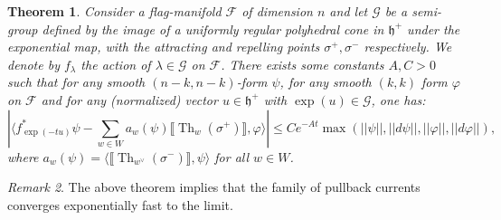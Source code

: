 \documentclass[12pt]{amsbook}%
\newtheorem{thm}{Theorem}[chapter]
\theoremstyle{definition}
\theoremstyle{remark}
\newtheorem{rem}[thm]{Remark}
\numberwithin{section}{chapter}
\numberwithin{subsection}{section}
\numberwithin{figure}{chapter}
\DeclareMathOperator{\Th}{Th}
\newcommand\intcur[1]{\llbracket #1 \rrbracket}
\def\cF{{\mathscr{F}}}
\begin{document}
{{  
\begin{thm} \label{thm_extension_harvey_lawson} Consider a flag-manifold $\cF$ of dimension $n$ and let $\mathcal{G}$ be a semi-group defined by the image of a uniformly regular polyhedral cone in $\mathfrak{h}^+$ under the exponential map, with the attracting and repelling points $\sigma^+, \sigma^-$ respectively. 
We denote by  $f_{\lambda}$ the action of $ \lambda\in \mathcal{G}$ on $\cF$. There exists
some constants $A,C>0$ such that for any smooth  $(n-k,n-k)$-form $\psi$, for any smooth $(k,k)$ form $ \varphi$ on $\cF$ and
 for any (normalized) vector  $ u\in \mathfrak{h}^+$ with $\exp(u) \in \mathcal{G}$, one has: 
\begin{equation}\label{eq_diff_smooth}
\left| \langle f_{\exp({-tu})}^* \psi - \sum_{w\in W} a_w(\psi) \intcur{\Th_w(\sigma^+) } , \varphi \rangle \right | \leqslant C e^{- At} \max (||\psi ||, || d\psi || , ||\varphi ||, || d\varphi||),
\end{equation}    
where $a_w (\psi) = \langle \intcur{\Th_{w^\vee}(\sigma^-)} ,\psi \rangle$ for all $w\in W$.
\end{thm}

\begin{rem} 
The above theorem implies that the family of pullback currents converges exponentially fast to the limit. 
\end{rem}

}}
\end{document}
